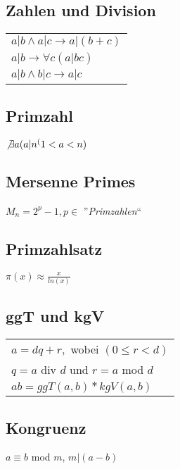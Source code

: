 \subsection{Zahlen und Division}
\begin{tabular}{l}
    $ a|b \land a|c \rightarrow a|(b + c) $ \\
    $ a|b \rightarrow \forall c(a|bc) $ \\
    $ a|b \land b|c \rightarrow a|c $ \\
\end{tabular}

\subsection{Primzahl}
$ \not \exists a (a|n ^ (1 < a < n) $

\subsection{Mersenne Primes}
$ M_n = 2^p - 1, p \in $ ''\textit{Primzahlen}``

\subsection{Primzahlsatz}
$ \pi (x) \approx \frac{x}{ln(x)} $

\subsection{ggT und kgV}
\begin{tabular}{l}
    $ a = dq + r, $ wobei $ (0 \leq r < d)$ \\
    $ q = a $ div $ d $ und $ r = a $ mod $ d $ \\
    $ ab = ggT(a, b) * kgV(a, b) $ \\
\end{tabular}

\subsection{Kongruenz}
$ a \equiv b $ mod $ m $, $ m|(a - b) $ 
